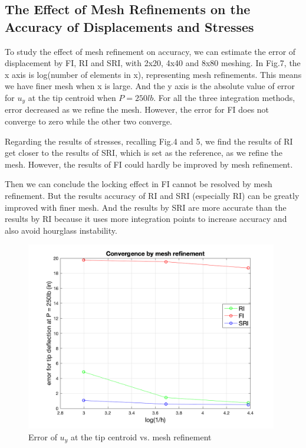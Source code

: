 \documentclass{article}
\begin{document}
\vspace*{1.5em}

\subsection{The Effect of Mesh Refinements on the Accuracy of Displacements and Stresses}

\vspace*{0.5em}
To study the effect of mesh refinement on accuracy, we can estimate the error of displacement by FI, RI and SRI, with 2x20, 4x40 and 8x80 meshing.
In Fig.7, the x axis is log(number of elements in x), representing mesh refinements. This means we have finer mesh when x is large. And the y axis is the absolute value of error for $u_y$ at the tip centroid when $P = 250 lb$. For all the three integration methods, error decreased as we refine the mesh. However, the error for FI does not converge to zero while the other two converge. 

Regarding the results of stresses, recalling Fig.4 and 5, we find the results of RI get closer to the results of SRI, which is set as the reference, as we refine the mesh. However, the results of FI could hardly be improved by mesh refinement.

Then we can conclude the locking effect in FI cannot be resolved by mesh refinement. But the results accuracy of RI and SRI (especially RI) can be greatly improved with finer mesh. And the results by SRI are more accurate than the results by RI because it uses more integration points to increase accuracy and also avoid hourglass instability.

\begin{figure}[H]
    \centering
    \includegraphics[width=11cm]{error.png}
    \caption{Error of $u_y$ at the tip centroid vs. mesh refinement}
\end{figure}

\vspace*{1.5em}
\end{document}
